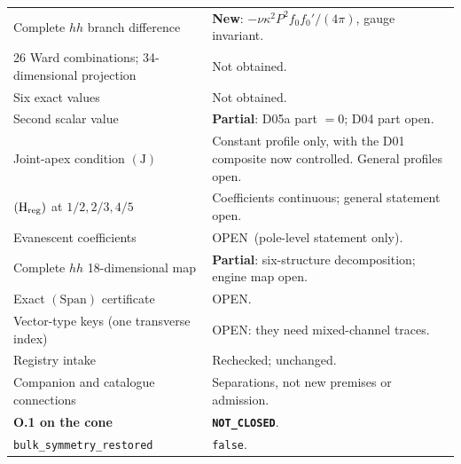 \documentclass[11pt,a4paper]{article}
\newcommand{\ka}{\kappa}
\newcommand{\Hreg}{(\mathrm H_{\rm reg})}
\newcommand{\Span}{(\mathrm{Span})}
\newcommand{\Jcond}{(\mathrm J)}
\newcommand{\loc}[1]{\nolinkurl{#1}}
\newcommand{\NOTCLOSED}{\texttt{NOT\_CLOSED}}
\newcommand{\OPEN}{\textsf{OPEN}}
\theoremstyle{plain}
\theoremstyle{definition}
\theoremstyle{remark}
\numberwithin{equation}{section}
\begin{document}
\begin{longtable}{@{}L{.50\linewidth}L{.44\linewidth}@{}}
Complete \(hh\) branch difference &
\textbf{New}: \(-\nu\ka^2P^2f_0f_0'/(4\pi)\), gauge invariant.\\[3pt]

26 Ward combinations; 34-dimensional projection & Not obtained.\\[3pt]

Six exact values & Not obtained.\\[3pt]

Second scalar value &
\textbf{Partial}: D05a part \(=0\); D04 part open.\\[3pt]

Joint-apex condition \(\Jcond\) &
Constant profile only, with the D01 composite now controlled.
General profiles open.\\[3pt]

\(\Hreg\) at \(1/2,2/3,4/5\) &
Coefficients continuous; general statement open.\\[3pt]

Evanescent coefficients &
\OPEN\ (pole-level statement only).\\[3pt]

Complete \(hh\) 18-dimensional map &
\textbf{Partial}: six-structure decomposition; engine map
open.\\[3pt]

Exact \(\Span\) certificate & \OPEN.\\[3pt]

Vector-type keys (one transverse index) &
\OPEN: they need mixed-channel traces.\\[3pt]

Registry intake & Rechecked; unchanged.\\[3pt]

Companion and catalogue connections &
Separations, not new premises or admission.\\[3pt]

\textbf{O.1 on the cone} & \textbf{\NOTCLOSED}.\\[3pt]

\loc{bulk_symmetry_restored} & \texttt{false}.\\
\end{longtable}
\endgroup
\end{document}
